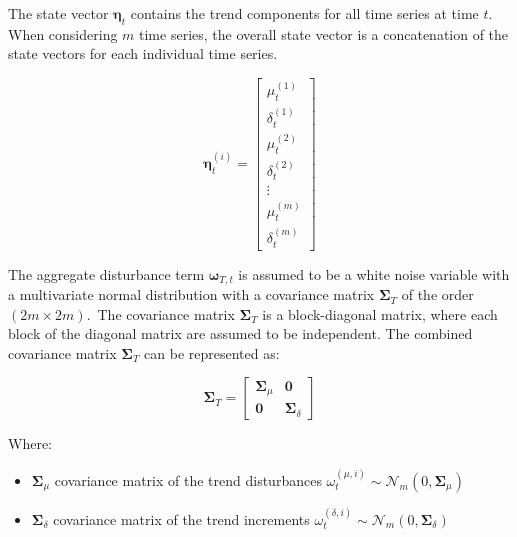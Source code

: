     The state vector $\bm{\eta}_{t}$ contains the trend components for all time series at time $t$.
    When considering $m$ time series, the overall state vector is a concatenation of the state vectors for each
    individual time series.

    \begin{equation}
        \bm{\eta}_{t}^{(i)}=
            \left[
                \begin{array}{c}
                    \mu_{t}^{(1)} \\
                    \delta_{t}^{(1)} \\
                    \mu_{t}^{(2)} \\
                    \delta_{t}^{(2)} \\
                    \vdots \\
                    \mu_{t}^{(m)} \\
                    \delta_{t}^{(m)}
                \end{array}
            \right]
        \label{eq:trend_state_vector}
    \end{equation}

    The aggregate disturbance term $\bm{\omega}_{T,t}$ is assumed to be a white noise variable with a multivariate normal distribution
    with a covariance matrix $\bm{\Sigma}_{T}$ of the order $(2m \times 2m)$.\ The covariance matrix $\bm{\Sigma}_{T}$
    is a block-diagonal matrix, where each block of the diagonal matrix are assumed to be independent.
    The combined covariance matrix $\bm{\Sigma}_{T}$ can be represented as:

    \begin{equation}
        \bm{\Sigma}_{T} =
            \left[
                \begin{array}{cc}
                    \mathbf{\Sigma}_{\mu} & \mathbf{0} \\
                    \mathbf{0}            & \mathbf{\Sigma}_{\delta}
                \end{array}
            \right]
        \label{eq:trend_covariance}
    \end{equation}

    Where:
    \begin{itemize}
        \item $\mathbf{\Sigma}_{\mu}$ covariance matrix of the trend disturbances  $\omega_{t}^{(\mu,i)} \sim \mathcal{N}_{m}(0, \bm{\Sigma}_{\mu})$
        \item $\mathbf{\Sigma}_{\delta}$ covariance matrix of the trend increments  $\omega_{t}^{(\delta,i)} \sim \mathcal{N}_{m}(0, \bm{\Sigma}_{\delta})$
    \end{itemize}

